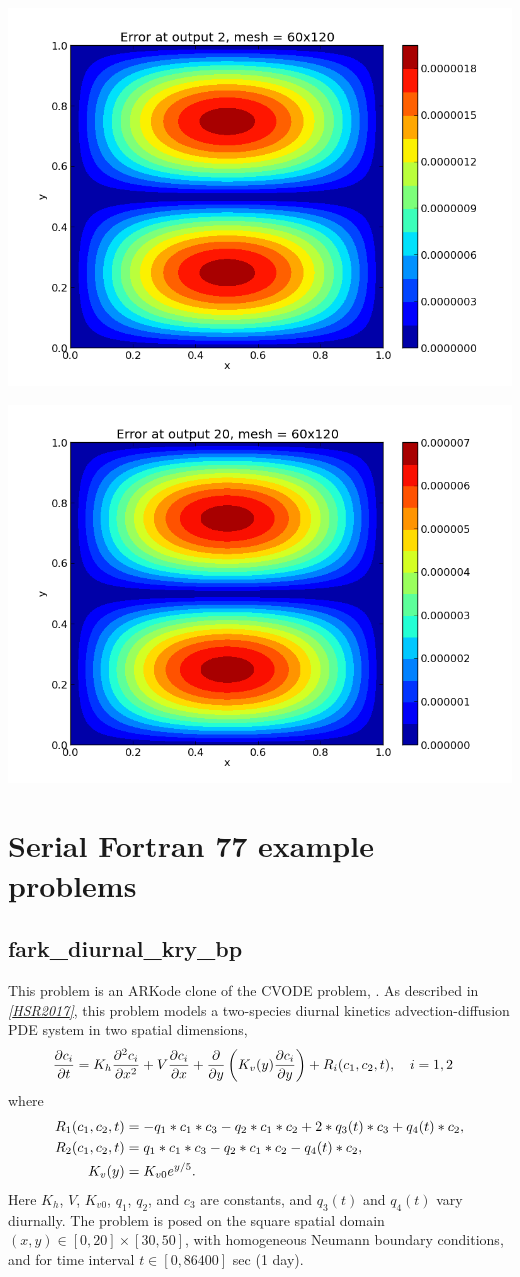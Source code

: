 \documentclass[letterpaper,10pt,english]{sphinxmanual}
\begin{document}
\includegraphics[width=0.300\linewidth]{plot-ark_heat2d_err_2.png}

\includegraphics[width=0.300\linewidth]{plot-ark_heat2d_err_3.png}


\chapter{Serial Fortran 77 example problems}
\label{f77_serial:serial-fortran-77-example-problems}\label{f77_serial::doc}\label{f77_serial:serial-f77}

\section{fark\_diurnal\_kry\_bp}
\label{f77_serial:fark-diurnal-kry-bp}\label{f77_serial:id1}
This problem is an ARKode clone of the CVODE problem,
.  As described in \label{f77_serial:id2}{\hyperref[References:hsr2017]{\emph{{[}HSR2017{]}}}}, this problem
models a two-species diurnal kinetics advection-diffusion PDE system
in two spatial dimensions,
\begin{gather}
\begin{split}\frac{\partial c_i}{\partial t} &=
  K_h \frac{\partial^2 c_i}{\partial x^2} +
  V \frac{\partial     c_i}{\partial x} +
  \frac{\partial}{\partial y}\left( K_v(y)
  \frac{\partial c_i}{\partial y}\right) +
  R_i(c_1,c_2,t),\quad i=1,2\end{split}\notag
\end{gather}
where
\begin{gather}
\begin{split}R_1(c_1,c_2,t) &= -q_1*c_1*c_3 - q_2*c_1*c_2 + 2*q_3(t)*c_3 + q_4(t)*c_2, \\
R_2(c_1,c_2,t) &=  q_1*c_1*c_3 - q_2*c_1*c_2 - q_4(t)*c_2, \\
K_v(y) &= K_{v0} e^{y/5}.\end{split}\notag
\end{gather}
Here \(K_h\), \(V\), \(K_{v0}\), \(q_1\), \(q_2\),
and \(c_3\) are constants, and \(q_3(t)\) and \(q_4(t)\)
vary diurnally.  The problem is posed on the square spatial domain
\((x,y) \in [0,20]\times[30,50]\), with homogeneous Neumann
boundary conditions, and for time interval \(t\in [0,86400]\) sec
(1 day).
\end{document}
